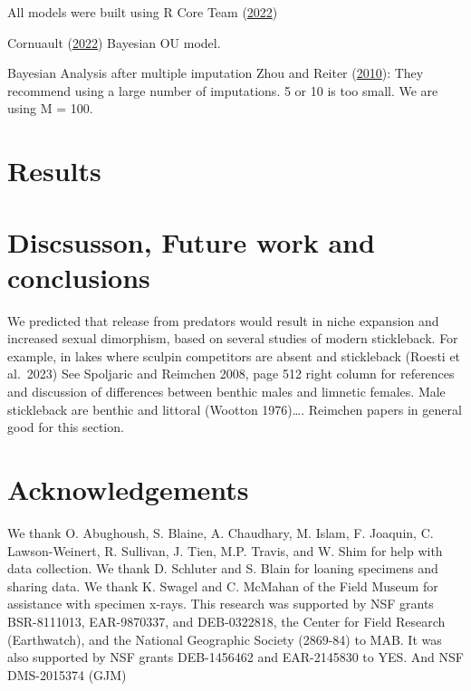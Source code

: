 \documentclass[
  12pt,
]{article}
\begin{document}
All models were built using R Core Team
(\protect\hyperlink{ref-R2022language}{2022})

Cornuault (\protect\hyperlink{ref-Cornault2022}{2022}) Bayesian OU
model.

Bayesian Analysis after multiple imputation Zhou and Reiter
(\protect\hyperlink{ref-ZhouReiter2009}{2010}): They recommend using a
large number of imputations. 5 or 10 is too small. We are using M = 100.

\hypertarget{sec:results}{%
\section{Results}\label{sec:results}}

\hypertarget{sec:conclusions}{%
\section{Discsusson, Future work and
conclusions}\label{sec:conclusions}}

We predicted that release from predators would result in niche expansion
and increased sexual dimorphism, based on several studies of modern
stickleback. For example, in lakes where sculpin competitors are absent
and stickleback (Roesti et al.~2023) See Spoljaric and Reimchen 2008,
page 512 right column for references and discussion of differences
between benthic males and limnetic females. Male stickleback are benthic
and littoral (Wootton 1976)\ldots. Reimchen papers in general good for
this section.

\hypertarget{acknowledgements}{%
\section*{Acknowledgements}\label{acknowledgements}}

We thank O. Abughoush, S. Blaine, A. Chaudhary, M. Islam, F. Joaquin, C.
Lawson-Weinert, R. Sullivan, J. Tien, M.P. Travis, and W. Shim for help
with data collection. We thank D. Schluter and S. Blain for loaning
specimens and sharing data. We thank K. Swagel and C. McMahan of the
Field Museum for assistance with specimen x-rays. This research was
supported by NSF grants BSR-8111013, EAR-9870337, and DEB-0322818, the
Center for Field Research (Earthwatch), and the National Geographic
Society (2869-84) to MAB. It was also supported by NSF grants
DEB-1456462 and EAR-2145830 to YES. And NSF DMS-2015374 (GJM)
\end{document}
